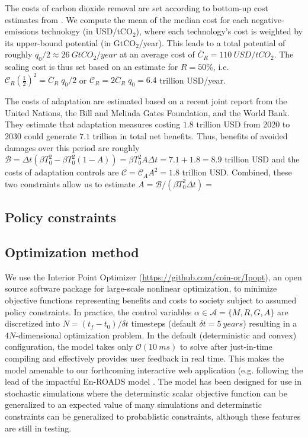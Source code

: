 \documentclass[9pt,twocolumn,twoside,lineno]{pnas-new}
\begin{document}
{The costs of carbon dioxide removal are set according to bottom-up cost estimates from \cite[][their Table 2]{fuss_negative_2018}. We compute the mean of the median cost for each negative-emissions technology (in USD/tCO$_{2}$), where each technology's cost is weighted by its upper-bound potential (in GtCO$_{2}$/year). This leads to a total potential of roughly $q_{0}/2 \approx \SI{26}{GtCO_{2}/year}$ at an average cost of $\overline{C}_{R}= \SI{110}{USD/tCO_{2}}$. The scaling cost is thus set based on an estimate for $R=50\%$, i.e. $\mathcal{C}_{R} \left(\frac{1}{2} \right)^{2} = \overline{C}_{R}\; q_{0} /2$ or $\mathcal{C}_{R} = 2 \overline{C}_{R}\; q_{0} = 6.4$ trillion USD/year.

The costs of adaptation are estimated based on a recent joint report from the United Nations, the Bill and Melinda Gates Foundation, and the World Bank. They estimate that adaptation measures costing $1.8$ trillion USD from 2020 to 2030 could generate $7.1$ trillion in total net benefits. Thus, benefits of avoided damages over this period are roughly $\mathcal{B} = \Delta t ( \beta T_{0}^{2} -  \beta T_{0}^{2} (1-A)) = \beta T_{0}^{2} A \Delta t = 7.1 + 1.8 = 8.9$ trillion USD and the costs of adaptation controls are $\mathcal{C} = \mathcal{C}_{A} A^{2} = 1.8$ trillion USD. Combined, these two constraints allow us to estimate $A = \mathcal{B}/(\beta T_{0}^{2} \Delta t) = $

\subsection*{Policy constraints}

\subsection*{Optimization method}
We use the Interior Point Optimizer \cite{wachter_implementation_2006} (\url{https://github.com/coin-or/Ipopt}), an open source software package for large-scale nonlinear optimization, to minimize objective functions representing benefits and costs to society subject to assumed policy constraints. In practice, the control variables $\alpha \in \mathcal{A} = \{ M, R, G, A\}$ are discretized into $N = (t_{f} - t_{0}) / \delta t$ timesteps (default $\delta t = \SI{5}{years}$) resulting in a $4N$-dimensional optimization problem. In the default (deterministic and convex) configuration, the model takes only $\mathcal{O}(\SI{10}{ms})$ to solve after just-in-time compiling and effectively provides user feedback in real time.  This makes the model amenable to our forthcoming interactive web application (e.g. following the lead of the impactful En-ROADS model \cite{siegel2018roads}. The model has been designed for use in stochastic simulations where the determinstic scalar objective function can be generalized to an expected value of many simulations and determinstic constraints can be generalized to probablistic constraints, although these features are still in testing.

}
\end{document}
